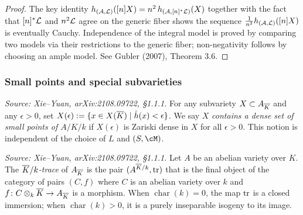 \begin{proof}
  The key identity \(h_{(\mathcal{A},\mathcal{L})}([n]X) = n^2\,h_{(\mathcal{A},[n]^*\mathcal{L})}(X)\) together with the
  fact that \([n]^*\mathcal{L}\) and \(n^2\mathcal{L}\) agree on the generic fiber shows the sequence
  \(\frac{1}{n^2}h_{(\mathcal{A},\mathcal{L})}([n]X)\) is eventually Cauchy.  Independence of the integral
  model is proved by comparing two models via their restrictions to the generic fiber;
  non-negativity follows by choosing an ample model.
  See Gubler (2007), Theorem 3.6.
\end{proof}

\subsubsection{Small points and special subvarieties}

\begin{definition}
  \label{def:SmallPoints}
  \textit{Source: Xie--Yuan, arXiv:2108.09722, \S1.1.1.}
  For any subvariety \(X \subset A_{\overline{K}}\) and any \(\epsilon > 0\), set
  \(X(\epsilon) := \{ x \in X(\overline{K}) \mid \hat{h}(x) < \epsilon \}\).
  We say \(X\) \emph{contains a dense set of small points of \(A/K/k\)} if \(X(\epsilon)\)
  is Zariski dense in \(X\) for all \(\epsilon > 0\).
  This notion is independent of the choice of \(L\) and \((S,\cM)\).
\end{definition}

\begin{definition}[\(\OK/k\)-trace]
  \label{def:KkTrace}
  \uses{}
  \textit{Source: Xie--Yuan, arXiv:2108.09722, \S1.1.1.}
  Let \(A\) be an abelian variety over \(K\).
  The \emph{\(\OK/k\)-trace} of \(A_{\overline{K}}\) is the pair \((A^{\overline{K}/k}, \operatorname{tr})\) that is
  the final object of the category of pairs \((C,f)\) where \(C\) is an abelian variety
  over \(k\) and \(f\colon C \otimes_k \overline{K} \to A_{\overline{K}}\) is a morphism.
  When \(\operatorname{char}(k)=0\), the map \(\operatorname{tr}\) is a closed immersion;
  when \(\operatorname{char}(k)>0\), it is a purely inseparable isogeny to its image.
\end{definition}

